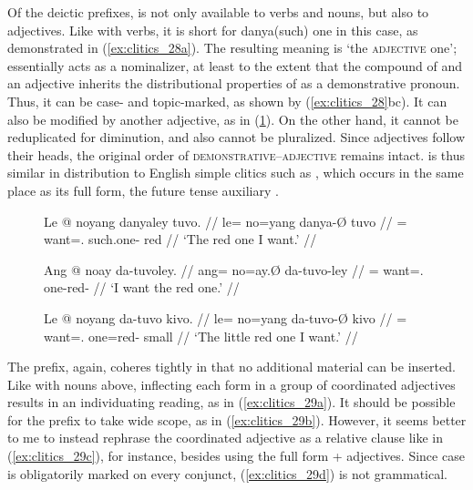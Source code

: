 \label{clitics_preadj_da}
Of the deictic prefixes,  is not only available to verbs and
nouns, but also to adjectives. Like with verbs, it is short for 
{danya}{(such) one} in this case, as demonstrated in (\ref{ex:clitics_28a}).
The resulting meaning is `the \textsc{adjective} one'; 
essentially acts as a nominalizer, at least to the extent that the compound of
 and an adjective inherits the distributional properties of
 as a demonstrative pronoun. Thus, it can be case- and 
topic-marked, as shown by (\ref{ex:clitics_28}bc). It can also be modified by
another adjective, as in (\ref{ex:clitics_28c}). On the other hand, it cannot
be reduplicated for diminution, and also cannot be pluralized. Since
adjectives follow their heads, the original order of
\textsc{demonstrative}--\textsc{adjective} remains intact.  is
thus similar in distribution to English simple clitics such as , which
occurs in the same place as its full form, the future tense auxiliary
.

\begin{figure}
\pex\label{ex:clitics_28}
\a\label{ex:clitics_28a}\begingl
	\gla Le @ noyang danyaley tuvo. //
	\glb le= no=yang danya-Ø tuvo //
	\glc \PatTI{}= want=\Fsg{}.\Aarg{} such.one-\Top{} red //
	\glft `The red one I want.' //
\endgl

\a\label{ex:clitics_28b}\begingl
	\gla Ang @ noay da-tuvoley. //
	\glb ang= no=ay.Ø da-tuvo-ley //
	\glc \AgtT{}= want=\Fsg{}.\Top{} one-red-\PargI{} //
	\glft `I want the red one.' //
\endgl

\a\label{ex:clitics_28c}\begingl
	\gla Le @ noyang da-tuvo kivo. //
	\glb le= no=yang da-tuvo-Ø kivo //
	\glc \PatTI{}= want=\Fsg{}.\Aarg{} one=red-\Top{} small //
	\glft `The little red one I want.' //
\endgl
\xe
\end{figure}

The prefix, again, coheres tightly in that no additional material can be
inserted. Like with nouns above, inflecting each form in a group of coordinated
adjectives results in an individuating reading, as in (\ref{ex:clitics_29a}). It
should be possible for the prefix to take wide scope, as in
(\ref{ex:clitics_29b}). However, it seems better to me to instead rephrase the
coordinated adjective as a relative clause like in (\ref{ex:clitics_29c}), for
instance, besides using the full form  + adjectives. Since
case is obligatorily marked on every conjunct, (\ref{ex:clitics_29d}) is not
grammatical.

